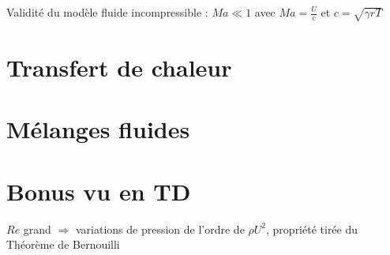 \documentclass[10pt,a4paper,twocolumn,fleqn]{article}
\begin{document}
Validité du modèle fluide incompressible : $Ma \ll 1$ 
avec $Ma=\frac{U}{c}$ et $c=\sqrt{\gamma r T}$


\section{Transfert de chaleur}


\section{Mélanges fluides} %


\section{Bonus vu en TD}
$Re$ grand $\Rightarrow$ variations de pression de l'ordre de $\rho U^2$, propriété 
tirée du Théorème de Bernouilli


\nocite{*}


\end{document}
